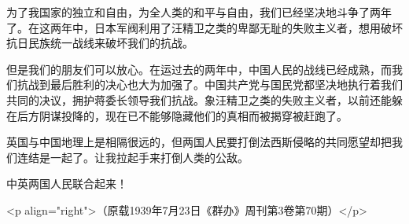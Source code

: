 为了我国家的独立和自由，为全人类的和平与自由，我们已经坚决地斗争了两年了。在这两年中，日本军阀利用了汪精卫之类的卑鄙无耻的失败主义者，想用破坏抗日民族统一战线来破坏我们的抗战。

但是我们的朋友们可以放心。在运过去的两年中，中国人民的战线已经成熟，而我们抗战到最后胜利的决心也大为加强了。中国共产党与国民党都坚决地执行着我们共同的决议，拥护蒋委长领导我们抗战。象汪精卫之类的失败主义者，以前还能躲在后方阴谋投降的，现在已不能够隐藏他们的真相而被揭穿被赶跑了。

英国与中国地理上是相隔很远的，但两国人民要打倒法西斯侵略的共同愿望却把我们连结是一起了。让我拉起手来打倒人类的公敌。

中英两国人民联合起来！

<p align="right">（原载1939年7月23日《群办》周刊第3卷第70期）</p>

